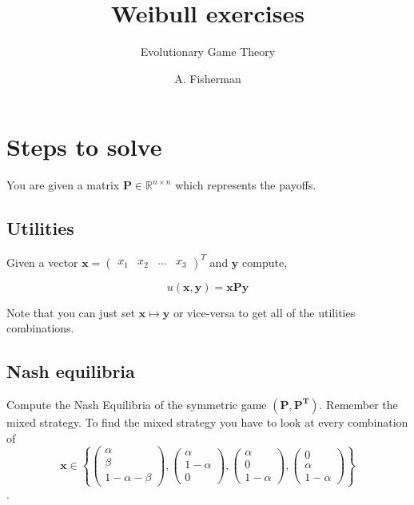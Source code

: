 \documentclass[american]{scrartcl}
\title{Weibull exercises}
\subtitle{Evolutionary Game Theory}
\author{A. Fisherman}
\newcommand{\Real}{\mathbb{R}}
\begin{document}
\maketitle

\section{Steps to solve}

You are given a matrix $\bm{P} \in \Real^{n\times n}$ which represents the payoffs.

\subsection{Utilities}

Given a vector $\bm{x} = \begin{pmatrix}
        x_1 & x_2 & \ldots & x_3
    \end{pmatrix}^T$ and $\bm{y}$ compute,

\begin{equation}
    u(\bm{x}, \bm{y}) = \bm{x} \bm{P} \bm{y}
\end{equation}

Note that you can just set $\bm{x} \mapsto \bm{y}$ or vice-versa to get all of the utilities combinations.

\subsection{Nash equilibria}

Compute the Nash Equilibria of the symmetric game $(\bm{P}, \bm{P^T})$. Remember the mixed strategy. To find the mixed strategy you have to look at every combination of
\begin{equation}
    \bm{x} \in \left\{ \begin{pmatrix}
        \alpha \\ \beta \\ 1 - \alpha - \beta
    \end{pmatrix}, \begin{pmatrix}
        \alpha \\ 1 - \alpha \\ 0
    \end{pmatrix}, \begin{pmatrix}
        \alpha \\ 0 \\ 1 - \alpha
    \end{pmatrix}, \begin{pmatrix}
        0 \\ \alpha \\ 1 - \alpha
    \end{pmatrix} \right\}
\end{equation}.
\end{document}
